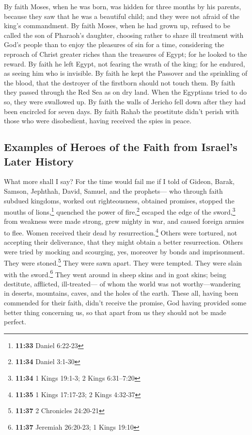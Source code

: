  By faith Moses, when he was born, was hidden for three
months by his parents, because they saw that he was a beautiful child;
and they were not afraid of the king's commandment.  By
faith Moses, when he had grown up, refused to be called the son of
Pharaoh's daughter,  choosing rather to share ill
treatment with God's people than to enjoy the pleasures of sin for a
time,  considering the reproach of Christ greater riches
than the treasures of Egypt; for he looked to the reward.
 By faith he left Egypt, not fearing the wrath of the
king; for he endured, as seeing him who is invisible.  By
faith he kept the Passover and the sprinkling of the blood, that the
destroyer of the firstborn should not touch them.  By
faith they passed through the Red Sea as on dry land. When the Egyptians
tried to do so, they were swallowed up.  By faith the
walls of Jericho fell down after they had been encircled for seven days.
 By faith Rahab the prostitute didn't perish with those
who were disobedient, having received the spies in peace.

\hypertarget{examples-of-heroes-of-the-faith-from-israels-later-history}{%
\subsection{Examples of Heroes of the Faith from Israel's Later
History}\label{examples-of-heroes-of-the-faith-from-israels-later-history}}

 What more shall I say? For the time would fail me if I
told of Gideon, Barak, Samson, Jephthah, David, Samuel, and the
prophets---  who through faith subdued kingdoms, worked
out righteousness, obtained promises, stopped the mouths of
lions,\footnote{\textbf{11:33} Daniel 6:22-23}  quenched
the power of fire,\footnote{\textbf{11:34} Daniel 3:1-30} escaped the
edge of the sword,\footnote{\textbf{11:34} 1 Kings 19:1-3; 2 Kings
  6:31--7:20} from weakness were made strong, grew mighty in war, and
caused foreign armies to flee.  Women received their dead
by resurrection.\footnote{\textbf{11:35} 1 Kings 17:17-23; 2 Kings
  4:32-37} Others were tortured, not accepting their deliverance, that
they might obtain a better resurrection.  Others were
tried by mocking and scourging, yes, moreover by bonds and imprisonment.
 They were stoned.\footnote{\textbf{11:37} 2 Chronicles
  24:20-21} They were sawn apart. They were tempted. They were slain
with the sword.\footnote{\textbf{11:37} Jeremiah 26:20-23; 1 Kings 19:10}
They went around in sheep skins and in goat skins; being destitute,
afflicted, ill-treated---  of whom the world was not
worthy---wandering in deserts, mountains, caves, and the holes of the
earth.  These all, having been commended for their faith,
didn't receive the promise,  God having provided some
better thing concerning us, so that apart from us they should not be
made perfect.

